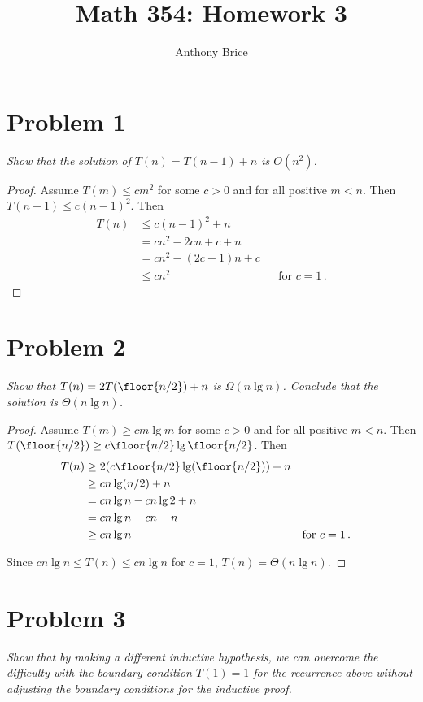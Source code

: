 \documentclass{abrice}
\title{Math 354: Homework 3}
\author{Anthony Brice}
\begin{document}
\maketitle

\section{Problem 1}
\emph{Show that the solution of $T(n) = T(n - 1) + n$ is $O(n^2)$.}
\medskip

\begin{proof}
  Assume $T(m) \leq cm^2$ for some $c > 0$ and for all positive $m < n$. Then
  $T(n-1) \leq c{(n-1)}^2$. Then
  \begin{align*}
    T(n) &\leq c{(n - 1)}^2 + n \\
    &= cn^2 - 2cn + c + n \\
    &= cn^2 - (2c - 1)n + c \\
    &\leq cn^2 && \text{for } c = 1 \, .
  \end{align*}
\end{proof}

\section{Problem 2}
\emph{Show that $T(n) = 2T(\floor{n/2}) + n$ is $\Omega(n \lg n)$. Conclude that
  the solution is $\Theta(n \lg n)$.}
\medskip

\begin{proof}
  Assume $T(m) \geq c m \lg m$ for some $c > 0$ and for all positive $m <
  n$. Then $T(\floor{n / 2}) \geq c \floor{n / 2} \lg{\floor{n / 2}}$. Then
  \begin{align*}
    T(n) &\geq 2(c \floor{n / 2} \lg(\floor{n / 2})) + n \\
    &\geq cn \lg(n/2) + n \\
    &= cn \lg n - cn \lg 2 + n \\
    &= cn \lg n - cn + n \\
    &\geq cn \lg n && \text{for } c = 1\, .
  \end{align*}

  Since $cn \lg n \leq T(n) \leq cn \lg n$ for $c = 1$,
  $T(n) = \Theta(n \lg n)$.
\end{proof}

\section{Problem 3}
\emph{Show that by making a different inductive hypothesis, we can overcome the
  difficulty with the boundary condition $T(1) = 1$ for the recurrence above
  without adjusting the boundary conditions for the inductive proof.}
\medskip
\end{document}
